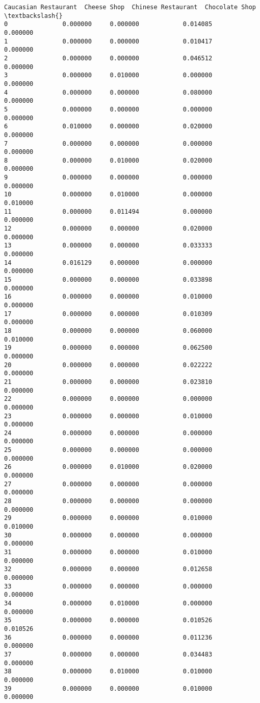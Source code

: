 \documentclass[11pt]{article}
\begin{document}
\begin{tcolorbox}[breakable, size=fbox, boxrule=.5pt, pad at break*=1mm, opacityfill=0]
\begin{Verbatim}[commandchars=\\\{\}]
    Caucasian Restaurant  Cheese Shop  Chinese Restaurant  Chocolate Shop  \textbackslash{}
0               0.000000     0.000000            0.014085        0.000000
1               0.000000     0.000000            0.010417        0.000000
2               0.000000     0.000000            0.046512        0.000000
3               0.000000     0.010000            0.000000        0.000000
4               0.000000     0.000000            0.080000        0.000000
5               0.000000     0.000000            0.000000        0.000000
6               0.010000     0.000000            0.020000        0.000000
7               0.000000     0.000000            0.000000        0.000000
8               0.000000     0.010000            0.020000        0.000000
9               0.000000     0.000000            0.000000        0.000000
10              0.000000     0.010000            0.000000        0.010000
11              0.000000     0.011494            0.000000        0.000000
12              0.000000     0.000000            0.020000        0.000000
13              0.000000     0.000000            0.033333        0.000000
14              0.016129     0.000000            0.000000        0.000000
15              0.000000     0.000000            0.033898        0.000000
16              0.000000     0.000000            0.010000        0.000000
17              0.000000     0.000000            0.010309        0.000000
18              0.000000     0.000000            0.060000        0.010000
19              0.000000     0.000000            0.062500        0.000000
20              0.000000     0.000000            0.022222        0.000000
21              0.000000     0.000000            0.023810        0.000000
22              0.000000     0.000000            0.000000        0.000000
23              0.000000     0.000000            0.010000        0.000000
24              0.000000     0.000000            0.000000        0.000000
25              0.000000     0.000000            0.000000        0.000000
26              0.000000     0.010000            0.020000        0.000000
27              0.000000     0.000000            0.000000        0.000000
28              0.000000     0.000000            0.000000        0.000000
29              0.000000     0.000000            0.010000        0.010000
30              0.000000     0.000000            0.000000        0.000000
31              0.000000     0.000000            0.010000        0.000000
32              0.000000     0.000000            0.012658        0.000000
33              0.000000     0.000000            0.000000        0.000000
34              0.000000     0.010000            0.000000        0.000000
35              0.000000     0.000000            0.010526        0.010526
36              0.000000     0.000000            0.011236        0.000000
37              0.000000     0.000000            0.034483        0.000000
38              0.000000     0.010000            0.010000        0.000000
39              0.000000     0.000000            0.010000        0.000000


\end{Verbatim}
\end{tcolorbox}
\end{document}
